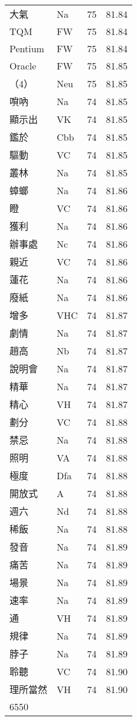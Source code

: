 \documentclass[twocolumn]{book}
\begin{document}
\begin{supertabular}{llrr}
大氣 & Na & 75 &  81.84\\
TQM & FW & 75 &  81.84\\
Pentium & FW & 75 &  81.84\\
Oracle & FW & 75 &  81.85\\
（4） & Neu & 75 &  81.85\\
嗩吶 & Na & 74 &  81.85\\
顯示出 & VK & 74 &  81.85\\
鑑於 & Cbb & 74 &  81.85\\
驅動 & VC & 74 &  81.85\\
叢林 & Na & 74 &  81.85\\
蟑螂 & Na & 74 &  81.86\\
瞪 & VC & 74 &  81.86\\
獲利 & Na & 74 &  81.86\\
辦事處 & Nc & 74 &  81.86\\
親近 & VC & 74 &  81.86\\
蓮花 & Na & 74 &  81.86\\
廢紙 & Na & 74 &  81.86\\
增多 & VHC & 74 &  81.87\\
劇情 & Na & 74 &  81.87\\
趙高 & Nb & 74 &  81.87\\
說明會 & Na & 74 &  81.87\\
精華 & Na & 74 &  81.87\\
精心 & VH & 74 &  81.87\\
劃分 & VC & 74 &  81.88\\
禁忌 & Na & 74 &  81.88\\
照明 & VA & 74 &  81.88\\
極度 & Dfa & 74 &  81.88\\
開放式 & A & 74 &  81.88\\
週六 & Nd & 74 &  81.88\\
稀飯 & Na & 74 &  81.88\\
發音 & Na & 74 &  81.89\\
痛苦 & Na & 74 &  81.89\\
場景 & Na & 74 &  81.89\\
速率 & Na & 74 &  81.89\\
通 & VH & 74 &  81.89\\
規律 & Na & 74 &  81.89\\
脖子 & Na & 74 &  81.89\\
聆聽 & VC & 74 &  81.90\\
理所當然 & VH & 74 &  81.90\\
6550\\

\end{supertabular}
\end{document}
